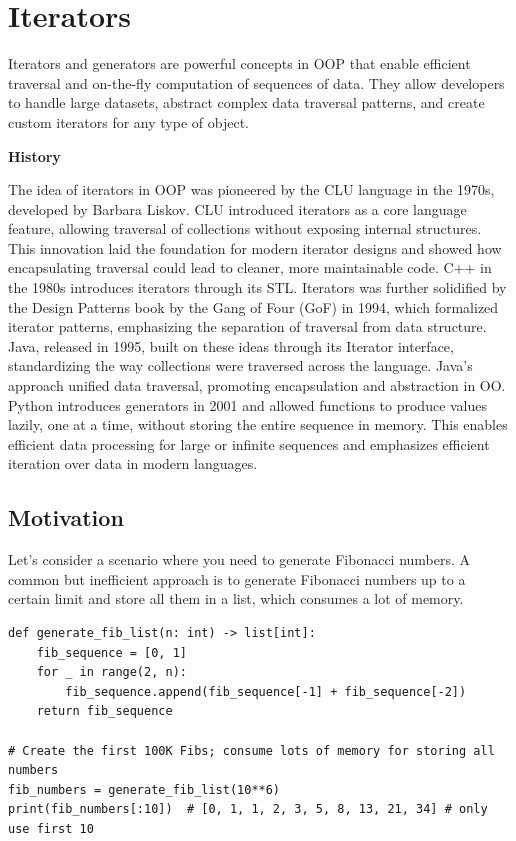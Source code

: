 \documentclass[oneside,11pt,dvipsnames]{book}
\newenvironment{historybox}[1][]{
  \small
  \begin{myhistorybox}
    {\small \textbf{#1}}
  }{
  \end{myhistorybox}
}
\begin{document}
\chapter{Iterators}\label{chap:iterators}
Iterators and generators are powerful concepts in OOP that enable efficient traversal and on-the-fly computation of sequences of data. They allow developers to handle large datasets, abstract complex data traversal patterns, and create custom iterators for any type of object. 

\begin{historybox}[History]
    The idea of iterators in OOP was pioneered by the CLU language in the 1970s, developed by Barbara Liskov. CLU introduced iterators as a core language feature, allowing traversal of collections without exposing internal structures. This innovation laid the foundation for modern iterator designs and showed how encapsulating traversal could lead to cleaner, more maintainable code. C++ in the 1980s introduces iterators through its STL. Iterators was further solidified by the Design Patterns book by the Gang of Four (GoF) in 1994, which formalized iterator patterns, emphasizing the separation of traversal from data structure.\\
    
    Java, released in 1995, built on these ideas through its Iterator interface, standardizing the way collections were traversed across the language. Java's approach unified data traversal, promoting encapsulation and abstraction in OO. Python introduces generators in 2001 and allowed functions to produce values lazily, one at a time, without storing the entire sequence in memory.  This enables efficient data processing for large or infinite sequences and emphasizes efficient iteration over data in modern languages.
\end{historybox}
\section{Motivation}
Let’s consider a scenario where you need to generate Fibonacci numbers. A common but inefficient approach is to generate Fibonacci numbers up to a certain limit and store all them in a list, which consumes a lot of memory.

\begin{lstlisting}
def generate_fib_list(n: int) -> list[int]:
    fib_sequence = [0, 1]
    for _ in range(2, n):
        fib_sequence.append(fib_sequence[-1] + fib_sequence[-2])
    return fib_sequence

# Create the first 100K Fibs; consume lots of memory for storing all numbers
fib_numbers = generate_fib_list(10**6)  
print(fib_numbers[:10])  # [0, 1, 1, 2, 3, 5, 8, 13, 21, 34] # only use first 10
\end{lstlisting}
\end{document}
